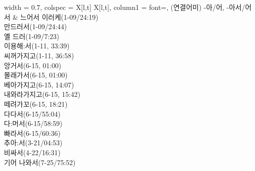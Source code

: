 \begin{longtblr}{
    width = 0.7\textwidth,
    colspec = {X[l,t] X[l,t]},
    column{1} = {font=\sffamily\bfseries},
  }
  (연결어미) -아/어, -아서/어서 & {느어서 이러케(1-09/24:19) \\ 만드러서(1-09/24:44) \\ 옐 드러(1-09/7:23) \\ 이용해:서(1-11,   33:39) \\ 씨꺼가지고(1-11, 36:58) \\ 앙거서(6-15, 01:00) \\ 몰래가서(6-15, 01:00) \\ 베아가지고(6-15,   14:07) \\ 내와라가지고(6-15, 15:42) \\ 떼려가꼬(6-15, 18:21) \\ 다다서(6-15/55:04) \\ 다:머서(6-15/58:59) \\ 빠라서(6-15/60:36) \\ 추아:서(3-21/04:53) \\ 비싸서(4-22/16:31) \\ 기어   나와서(7-25/75:52)} \\

\end{longtblr}
